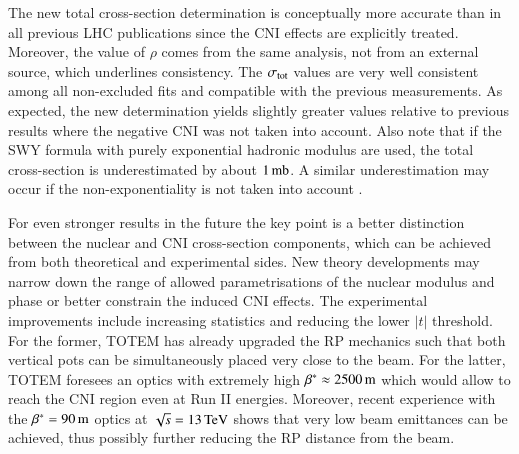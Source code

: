 The new total cross-section determination is conceptually more accurate than in all previous LHC publications since the CNI effects are explicitly treated. Moreover, the value of $\rho$ comes from the same analysis, not from an external source, which underlines consistency. The $\sigma_{\rm tot}$ values are very well consistent among all non-excluded fits and compatible with the previous measurements. As expected, the new determination yields slightly greater values relative to previous results where the negative CNI was not taken into account. Also note that if the SWY formula with purely exponential hadronic modulus are used, the total cross-section is underestimated by about $1\,{\rm mb}$. A similar underestimation may occur if the non-exponentiality is not taken into account \cite{block16}.

For even stronger results in the future the key point is a better distinction between the nuclear and CNI cross-section components, which can be achieved from both theoretical and experimental sides. New theory developments may narrow down the range of allowed parametrisations of the nuclear modulus and phase or better constrain the induced CNI effects. The experimental improvements include increasing statistics and reducing the lower $|t|$ threshold. For the former, TOTEM has already upgraded the RP mechanics such that both vertical pots can be simultaneously placed very close to the beam. For the latter, TOTEM foresees an optics with extremely high $\beta^* \approx 2500\,{\rm m}$ which would allow to reach the CNI region even at Run II energies. Moreover, recent experience with the $\beta^* = 90\,{\rm m}$ optics at $\sqrt s = 13\,{\rm TeV}$ shows that very low beam emittances can be achieved, thus possibly further reducing the RP distance from the beam.
